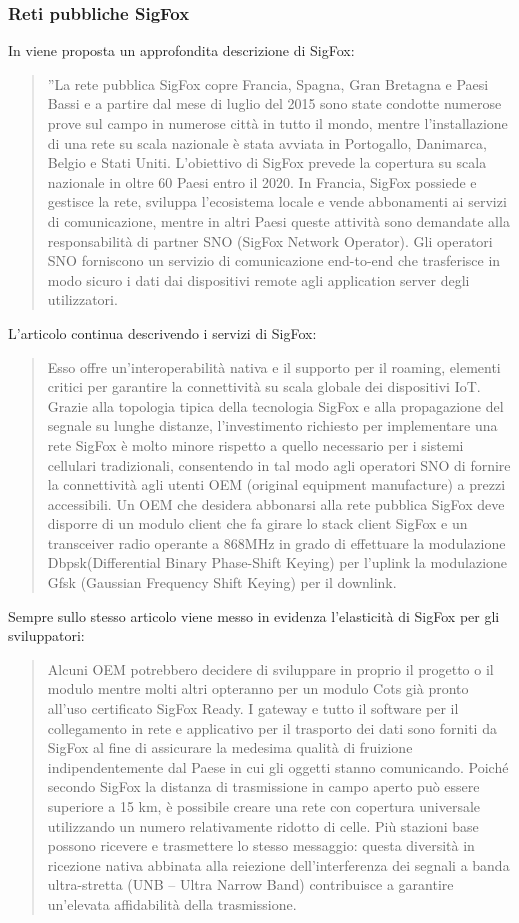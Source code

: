 \documentclass[a4paper]{report} %
\begin{document}
\subsubsection{Reti pubbliche SigFox}
In \cite{art:rif.23} viene proposta un approfondita descrizione di SigFox:
\begin{quote}
	''La rete pubblica SigFox copre Francia, Spagna, Gran Bretagna e Paesi Bassi e a partire dal mese di luglio del 2015 sono state condotte numerose prove sul campo in numerose città in tutto il mondo, mentre l'installazione di una rete su scala nazionale è stata avviata in Portogallo, Danimarca, Belgio e Stati Uniti. L'obiettivo di SigFox prevede la copertura su scala nazionale in oltre 60 Paesi entro il 2020. In Francia, SigFox possiede e gestisce la rete, sviluppa l'ecosistema locale e vende abbonamenti ai servizi di comunicazione, mentre in altri Paesi queste attività sono demandate alla responsabilità di partner SNO (SigFox Network Operator). Gli operatori SNO forniscono un servizio di comunicazione end-to-end che trasferisce in modo sicuro i dati dai dispositivi remote agli application server degli utilizzatori. 
\end{quote}
L'articolo continua descrivendo i servizi di SigFox:
\begin{quote}	
	Esso offre un'interoperabilità nativa e il supporto per il roaming, elementi critici per garantire la connettività su scala globale dei dispositivi IoT. Grazie alla topologia tipica della tecnologia SigFox e alla propagazione del segnale su lunghe distanze, l'investimento richiesto per implementare una rete SigFox è molto minore rispetto a quello necessario per i sistemi cellulari tradizionali, consentendo in tal modo agli operatori SNO di fornire la connettività agli utenti OEM (original equipment manufacture) a prezzi accessibili. Un OEM che desidera abbonarsi alla rete pubblica SigFox deve disporre di un modulo client che fa girare lo stack client SigFox e un transceiver radio operante a 868MHz in grado di effettuare la modulazione Dbpsk(Differential Binary Phase-Shift Keying) per l'uplink la modulazione Gfsk (Gaussian Frequency Shift Keying) per il downlink. 
\end{quote}
Sempre sullo stesso articolo viene messo in evidenza l'elasticità di SigFox per gli sviluppatori:
\begin{quote}	
	Alcuni OEM potrebbero decidere di sviluppare in proprio il progetto o il modulo mentre molti altri opteranno per un modulo Cots già pronto all'uso certificato SigFox Ready. I gateway e tutto il software per il collegamento in rete e applicativo per il trasporto dei dati sono forniti da SigFox al fine di assicurare la medesima qualità di fruizione indipendentemente dal Paese in cui gli oggetti stanno comunicando. Poiché secondo SigFox la distanza di trasmissione in campo aperto può essere superiore a 15 km, è possibile creare una rete con copertura universale utilizzando un numero relativamente ridotto di celle. Più stazioni base possono ricevere e trasmettere lo stesso messaggio: questa diversità in ricezione nativa abbinata alla reiezione dell'interferenza dei segnali a banda ultra-stretta (UNB – Ultra Narrow Band) contribuisce a garantire un'elevata affidabilità della trasmissione.  %
\end{quote}
\end{document}
